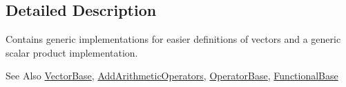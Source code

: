 \subsection{Detailed Description}
Contains generic implementations for easier definitions of vectors and a generic scalar product implementation. \begin{DoxySeeAlso}{See Also}
\hyperlink{classSpacy_1_1VectorBase}{Vector\-Base}, \hyperlink{classSpacy_1_1AddArithmeticOperators}{Add\-Arithmetic\-Operators}, \hyperlink{classSpacy_1_1OperatorBase}{Operator\-Base}, \hyperlink{classSpacy_1_1FunctionalBase}{Functional\-Base} 
\end{DoxySeeAlso}

